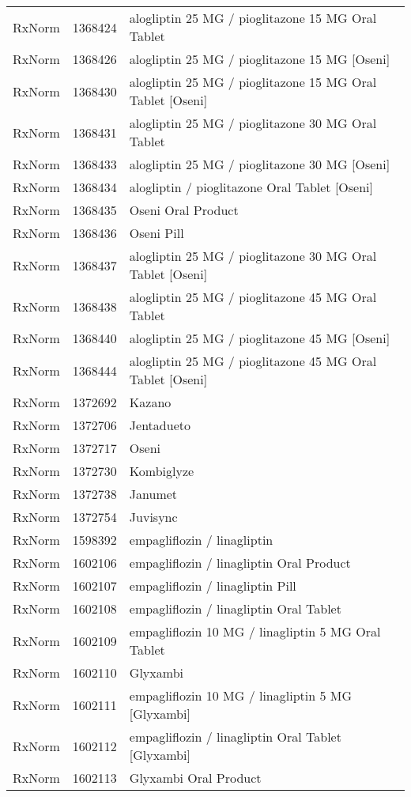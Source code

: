 \begin{longtable}{p{}p{}p{}}
  RxNorm & 1368424 & alogliptin 25 MG / pioglitazone 15 MG Oral Tablet \\ 
  RxNorm & 1368426 & alogliptin 25 MG / pioglitazone 15 MG [Oseni] \\ 
  RxNorm & 1368430 & alogliptin 25 MG / pioglitazone 15 MG Oral Tablet [Oseni] \\ 
  RxNorm & 1368431 & alogliptin 25 MG / pioglitazone 30 MG Oral Tablet \\ 
  RxNorm & 1368433 & alogliptin 25 MG / pioglitazone 30 MG [Oseni] \\ 
  RxNorm & 1368434 & alogliptin / pioglitazone Oral Tablet [Oseni] \\ 
  RxNorm & 1368435 & Oseni Oral Product \\ 
  RxNorm & 1368436 & Oseni Pill \\ 
  RxNorm & 1368437 & alogliptin 25 MG / pioglitazone 30 MG Oral Tablet [Oseni] \\ 
  RxNorm & 1368438 & alogliptin 25 MG / pioglitazone 45 MG Oral Tablet \\ 
  RxNorm & 1368440 & alogliptin 25 MG / pioglitazone 45 MG [Oseni] \\ 
  RxNorm & 1368444 & alogliptin 25 MG / pioglitazone 45 MG Oral Tablet [Oseni] \\ 
  RxNorm & 1372692 & Kazano \\ 
  RxNorm & 1372706 & Jentadueto \\ 
  RxNorm & 1372717 & Oseni \\ 
  RxNorm & 1372730 & Kombiglyze \\ 
  RxNorm & 1372738 & Janumet \\ 
  RxNorm & 1372754 & Juvisync \\ 
  RxNorm & 1598392 & empagliflozin / linagliptin \\ 
  RxNorm & 1602106 & empagliflozin / linagliptin Oral Product \\ 
  RxNorm & 1602107 & empagliflozin / linagliptin Pill \\ 
  RxNorm & 1602108 & empagliflozin / linagliptin Oral Tablet \\ 
  RxNorm & 1602109 & empagliflozin 10 MG / linagliptin 5 MG Oral Tablet \\ 
  RxNorm & 1602110 & Glyxambi \\ 
  RxNorm & 1602111 & empagliflozin 10 MG / linagliptin 5 MG [Glyxambi] \\ 
  RxNorm & 1602112 & empagliflozin / linagliptin Oral Tablet [Glyxambi] \\ 
  RxNorm & 1602113 & Glyxambi Oral Product \\ 

\end{longtable}
